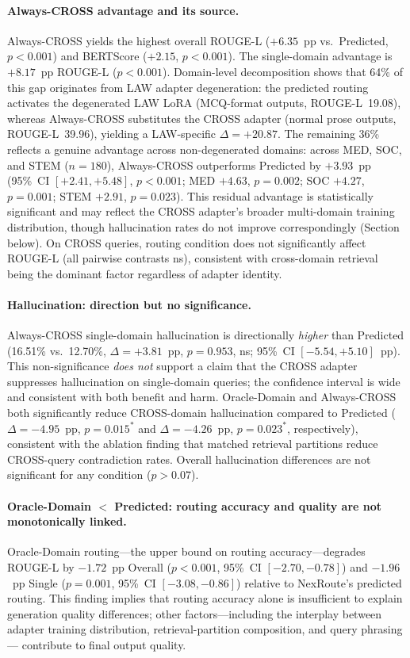 \documentclass[a4paper,fleql]{cas-sc}
\begin{document}
\paragraph{Always-CROSS advantage and its source.}
Always-CROSS yields the highest overall ROUGE-L ($+6.35$~pp vs.\ Predicted,
$p{<}0.001$) and BERTScore ($+2.15$, $p{<}0.001$).
The single-domain advantage is $+8.17$~pp ROUGE-L ($p{<}0.001$).
Domain-level decomposition shows that 64\% of this gap originates from LAW adapter
degeneration: the predicted routing activates
the degenerated LAW LoRA (MCQ-format outputs, ROUGE-L~19.08), whereas
Always-CROSS substitutes the CROSS adapter (normal prose outputs, ROUGE-L~39.96),
yielding a LAW-specific $\Delta{=}{+}20.87$.
The remaining 36\% reflects a genuine advantage across non-degenerated domains:
across MED, SOC, and STEM ($n{=}180$), Always-CROSS outperforms Predicted by
$+3.93$~pp (95\%~CI $[{+}2.41,{+}5.48]$, $p{<}0.001$; MED $+4.63$, $p{=}0.002$;
SOC $+4.27$, $p{=}0.001$; STEM $+2.91$, $p{=}0.023$).
This residual advantage is statistically significant and may reflect the CROSS
adapter's broader multi-domain training distribution, though hallucination rates
do not improve correspondingly (Section below).
On CROSS queries, routing condition does not significantly affect ROUGE-L
(all pairwise contrasts \textsf{ns}), consistent with cross-domain retrieval
being the dominant factor regardless of adapter identity.

\paragraph{Hallucination: direction but no significance.}
Always-CROSS single-domain hallucination is directionally \emph{higher}
than Predicted (16.51\% vs.\ 12.70\%, $\Delta{=}{+}3.81$~pp,
$p{=}0.953$, \textsf{ns}; 95\%~CI $[-5.54,{+}5.10]$~pp).
This non-significance \emph{does not} support a claim that the CROSS adapter
suppresses hallucination on single-domain queries; the confidence interval
is wide and consistent with both benefit and harm.
Oracle-Domain and Always-CROSS both significantly reduce CROSS-domain
hallucination compared to Predicted ($\Delta{=}{-}4.95$~pp, $p{=}0.015^{*}$
and $\Delta{=}{-}4.26$~pp, $p{=}0.023^{*}$, respectively),
consistent with the ablation finding that matched retrieval partitions
reduce CROSS-query contradiction rates.
Overall hallucination differences are not significant for any condition
($p{>}0.07$).

\paragraph{Oracle-Domain $<$ Predicted: routing accuracy and quality are not monotonically linked.}
Oracle-Domain routing---the upper bound on routing accuracy---degrades ROUGE-L
by $-1.72$~pp Overall ($p{<}0.001$, 95\%~CI $[-2.70,{-}0.78]$) and $-1.96$~pp
Single ($p{=}0.001$, 95\%~CI $[-3.08,{-}0.86]$) relative to NexRoute's predicted routing.
This finding implies that routing accuracy alone is insufficient to explain
generation quality differences; other factors---including the interplay between
adapter training distribution, retrieval-partition composition, and query phrasing---
contribute to final output quality.
\end{document}
